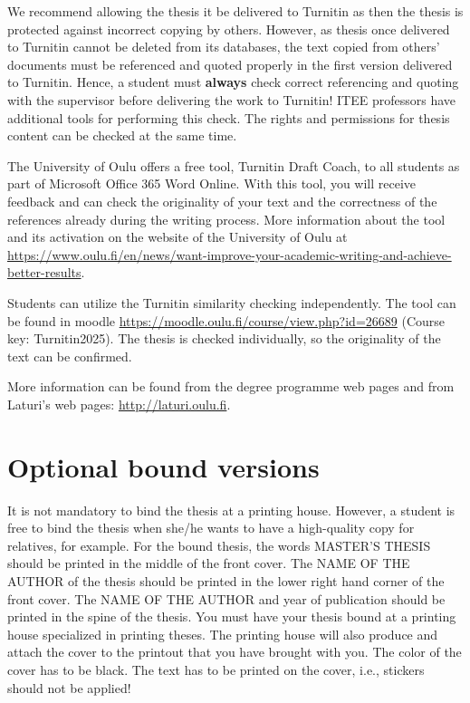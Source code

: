 We recommend allowing the thesis it be delivered to Turnitin as then
the thesis is protected against incorrect copying by others. However,
as thesis once delivered to Turnitin cannot be deleted from its
databases, the text copied from others’ documents must be referenced
and quoted properly in the first version delivered to Turnitin.
Hence, a student must \textbf{always} check correct referencing and
quoting with the supervisor before delivering the work to Turnitin!
ITEE professors have additional tools for performing this check. The
rights and permissions for thesis content can be checked at the same time.

The University of Oulu offers a free tool, Turnitin Draft Coach, to
all students as part of
Microsoft Office 365 Word Online. With this tool, you will receive
feedback and can check the
originality of your text and the correctness of the references
already during the writing process.
More information about the tool and its activation on the website of
the University of Oulu at
\url{https://www.oulu.fi/en/news/want-improve-your-academic-writing-and-achieve-better-results}.

Students can utilize the Turnitin similarity checking independently.
The tool can be found
in moodle \url{https://moodle.oulu.fi/course/view.php?id=26689}
(Course key: Turnitin2025). The
thesis is checked individually, so the originality of the text can be confirmed.

More information can be found from the degree programme web pages
\cite{mscstudies} and from Laturi’s web pages: \url{http://laturi.oulu.fi}.

\section{Optional bound versions}

It is not mandatory to bind the thesis at a printing house. However,
a student is free to bind the thesis when she/he wants to have a
high-quality copy for relatives, for example. For the bound thesis,
the words MASTER’S THESIS should be printed in the middle of the
front cover. The NAME OF THE AUTHOR of the thesis should be printed
in the lower right hand corner of the front cover. The NAME OF THE
AUTHOR and year of publication should be printed in the spine of the
thesis. You must have your thesis bound at a printing house
specialized in printing theses. The printing house will also produce
and attach the cover to the printout that you have brought with you.
The color of the cover has to be black. The text has to be printed on
the cover, i.e., stickers should not be applied!

